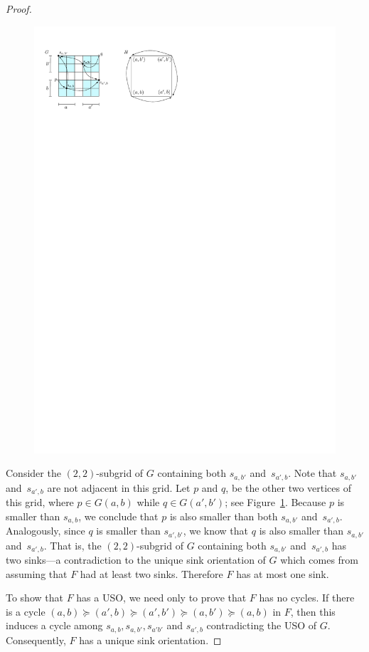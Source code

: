 \documentclass[a4paper,10pt]{article}
\begin{document}
\begin{proof}
 \begin{figure}[h]
 \centering
 \includegraphics{inducedUSO.pdf}
 \caption{\small }
 \label{fig:InducedUSO}
 \end{figure}

Consider the $(2,2)$-subgrid of $G$ containing both $s_{a,b'}$ and~$s_{a',b}$. Note that $s_{a,b'}$ and~$s_{a',b}$ are not adjacent in this grid. Let $p$ and $q$, be the other two vertices of this grid, where $p\in G(a, b)$ while $q\in G(a', b')$; see Figure~\ref{fig:InducedUSO}.
Because $p$ is smaller than $s_{a, b}$, we conclude that $p$ is also smaller than both $s_{a,b'}$ and~$s_{a',b}$. Analogously, since $q$ is smaller than $s_{a',b'}$, we know that $q$ is also smaller than $s_{a,b'}$ and~$s_{a',b}$. That is, the $(2,2)$-subgrid of $G$ containing both $s_{a,b'}$ and~$s_{a',b}$ has two sinks---a contradiction to the unique sink orientation of $G$ which comes from assuming that $F$ had at least two sinks.
Therefore $F$ has at most one sink.

To show that $F$ has a USO, we need only to prove that $F$ has no cycles.
If there is a cycle $(a,b)\succeq (a', b) \succeq (a', b') \succeq (a, b') \succeq (a,b)$ in $F$, then
this induces a cycle among $s_{a,b}, s_{a, b'}, s_{a'b'}$ and $s_{a', b}$ contradicting the USO of $G$. Consequently, $F$ has a unique sink orientation.
\end{proof}
\end{document}
